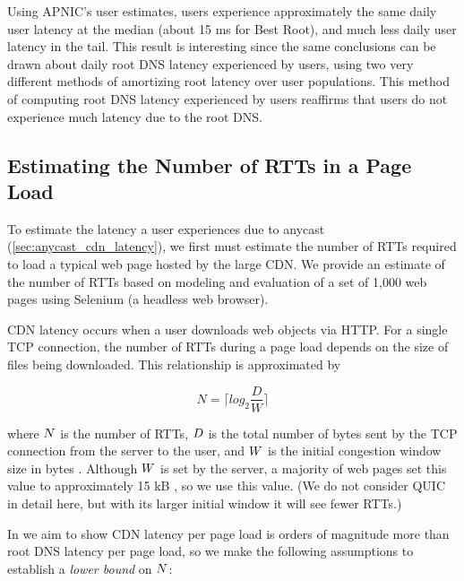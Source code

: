 \documentclass[sigconf,letterpaper,nonacm,10pt,anonymous]{acmart}
\begin{document}
Using APNIC's user estimates, users experience approximately the same
daily user latency at the median (about 15 ms for Best Root), and much
less daily user latency in the tail. This result is interesting since
the same conclusions can be drawn about daily root DNS latency
experienced by users, using two very different methods of amortizing
root latency over user populations. This method of computing root DNS
latency experienced by users reaffirms that users do not experience much
latency due to the root DNS.

\subsection{Estimating the Number of RTTs in a Page
Load}\label{estimating-the-number-of-rtts-in-a-page-load-1}

\label{ap:num_rtts_ppl}

To estimate the latency a user experiences due to anycast
(\cref{sec:anycast_cdn_latency}), we first must estimate the number of
RTTs required to load a typical web page hosted by the large CDN. We
provide an estimate of the number of RTTs based on modeling and
evaluation of a set of 1,000 web pages using Selenium (a headless web
browser).

CDN latency occurs when a user downloads web objects via HTTP. For a
single TCP connection, the number of RTTs during a page load depends on
the size of files being downloaded. This relationship is approximated by

\begin{equation}
\label{eq:rtt_calculation}
N = \lceil log_{2}{\frac{D} {W}} \rceil
\end{equation}

where \(\mathnormal{N}\) is the number of RTTs, \(\mathnormal{D}\) is
the total number of bytes sent by the TCP connection from the server to
the user, and \(\mathnormal{W}\) is the initial congestion window size
in bytes \cite{Heidemann97b,Cardwell00a}. Although \(\mathnormal{W}\) is
set by the server, a majority of web pages set this value to
approximately 15 kB \cite{iwIMC17}, so we use this value. (We do not
consider QUIC in detail here, but with its larger initial window it will
see fewer RTTs.)

In  we aim to show CDN latency per page
load is orders of magnitude more than root DNS latency per page load, so
we make the following assumptions to establish a \emph{lower bound} on
\(\mathnormal{N}\):
\end{document}
